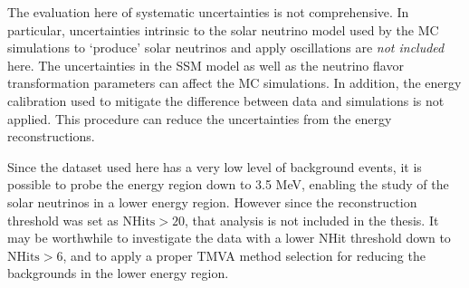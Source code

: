 The evaluation here of systematic uncertainties is not comprehensive. In particular, uncertainties intrinsic to the solar neutrino model used by the MC simulations to `produce' solar neutrinos and apply oscillations are {\em not included} here. The uncertainties in the SSM model as well as the neutrino flavor transformation parameters can affect the MC simulations. In addition, the energy calibration used to mitigate the difference between data and simulations is not applied. This procedure can reduce the uncertainties from the energy reconstructions. 

Since the dataset used here has a very low level of background events, it is possible to probe the energy region down to 3.5 MeV, enabling the study of the solar neutrinos in a lower energy region. However since the reconstruction threshold was set as $\mathrm{NHits}>20$, that analysis is not included in the thesis. It may be worthwhile to investigate the data with a lower NHit threshold down to $\mathrm{NHits}>6$, and to apply a proper TMVA method selection for reducing the backgrounds in the lower energy region.
